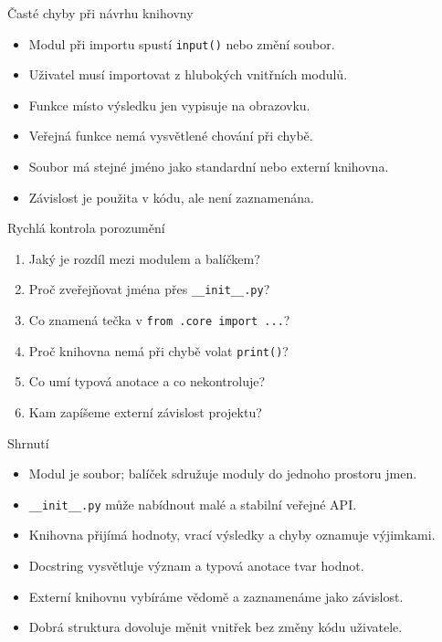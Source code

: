 \documentclass[aspectratio=169]{beamer}
\begin{document}
\begin{frame}{Časté chyby při návrhu knihovny}
  \begin{itemize}
    \item Modul při importu spustí \texttt{input()} nebo změní soubor.
    \item Uživatel musí importovat z hlubokých vnitřních modulů.
    \item Funkce místo výsledku jen vypisuje na obrazovku.
    \item Veřejná funkce nemá vysvětlené chování při chybě.
    \item Soubor má stejné jméno jako standardní nebo externí knihovna.
    \item Závislost je použita v kódu, ale není zaznamenána.
  \end{itemize}
\end{frame}

\begin{frame}{Rychlá kontrola porozumění}
  \begin{enumerate}
    \item Jaký je rozdíl mezi modulem a balíčkem?
    \item Proč zveřejňovat jména přes \texttt{\_\_init\_\_.py}?
    \item Co znamená tečka v \texttt{from .core import ...}?
    \item Proč knihovna nemá při chybě volat \texttt{print()}?
    \item Co umí typová anotace a co nekontroluje?
    \item Kam zapíšeme externí závislost projektu?
  \end{enumerate}
\end{frame}

\begin{frame}{Shrnutí}
  \begin{itemize}
    \item Modul je soubor; balíček sdružuje moduly do jednoho prostoru jmen.
    \item \texttt{\_\_init\_\_.py} může nabídnout malé a stabilní veřejné API.
    \item Knihovna přijímá hodnoty, vrací výsledky a chyby oznamuje výjimkami.
    \item Docstring vysvětluje význam a typová anotace tvar hodnot.
    \item Externí knihovnu vybíráme vědomě a zaznamenáme jako závislost.
    \item Dobrá struktura dovoluje měnit vnitřek bez změny kódu uživatele.
  \end{itemize}
\end{frame}
\end{document}
